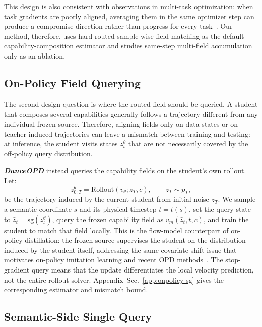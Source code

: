 \documentclass{llmxive}
\providecommand{\name}{\textsl{\textbf{DanceOPD}}\xspace}
\begin{document}
This design is also consistent with observations in multi-task optimization: when task gradients are poorly aligned, averaging them in the same optimizer step can produce a compromise direction rather than progress for every task~\cite{chen2018gradnorm,sener2018multi,yu2020gradient,liu2021conflict,javaloy2021rotograd}. Our method, therefore, uses hard-routed sample-wise field matching as the default capability-composition estimator and studies same-step multi-field accumulation only as an ablation.


\subsection{On-Policy Field Querying}
\label{sec:onpolicy-query}

The second design question is where the routed field should be queried. A student that composes several capabilities generally follows a trajectory different from any individual frozen source. Therefore, aligning fields only on data states or on teacher-induced trajectories can leave a mismatch between training and testing: at inference, the student visits states $z_t^\theta$ that are not necessarily covered by the off-policy query distribution.

\name{} instead queries the capability fields on the student's own rollout. Let:
\begin{equation}
  z_{0:T}^{\theta}=\mathrm{Rollout}(v_\theta; z_T,c), \qquad z_T\sim p_T,
  \label{eq:student-rollout}
\end{equation}
be the trajectory induced by the current student from initial noise $z_T$. We sample a semantic coordinate $s$ and its physical timestep $t=t(s)$, set the query state to $\bar z_t=\mathrm{sg}(z_t^\theta)$, query the frozen capability field as $v_m(\bar z_t,t,c)$, and train the student to match that field locally. This is the flow-model counterpart of on-policy distillation: the frozen source supervises the student on the distribution induced by the student itself, addressing the same covariate-shift issue that motivates on-policy imitation learning and recent OPD methods~\cite{ross2011reduction,agarwal2024policy,li2026diffusionopd,fang2026flow}. The stop-gradient query means that the update differentiates the local velocity prediction, not the entire rollout solver. Appendix~Sec.~\ref{app:onpolicy-sg} gives the corresponding estimator and mismatch bound.

\subsection{Semantic-Side Single Query}
\label{sec:query-design}
\end{document}
